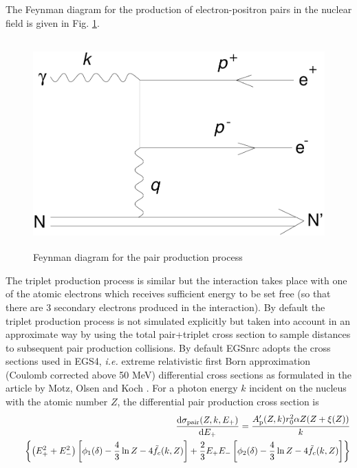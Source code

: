 The Feynman diagram for the production of electron-positron pairs
in the nuclear field is given in Fig. \ref{pair_fig}.
\begin{figure}[h]
\includegraphics[height=8cm,width=12cm]{figures/pair}
\caption{\label{pair_fig} Feynman diagram for the pair
production process}
\end{figure}
The triplet production process is similar but the interaction
takes place with one of the atomic electrons which receives
sufficient energy to be set free (so that there are 3 secondary electrons
produced in the interaction). By default
the triplet production process is
not simulated explicitly but taken into account in an approximate
way by using the total pair+triplet cross section to
sample distances to subsequent pair production collisions.
By default EGSnrc adopts the cross sections used in EGS4, {\em i.e.}
extreme relativistic first Born approximation
(Coulomb corrected above 50 MeV)
differential cross sections  as formulated in the article by
Motz, Olsen and Koch \cite{Mo69}. For a photon energy
$k$ incident on the nucleus with the atomic number $Z$, the
differential pair production cross section is
\begin{eqnarray}
\label{pair-e}
& & {{\rm d}\sigma_{\rm pair}(Z,k,E_+) \over {\rm d}E_+}  =
{A_{\rm p}'(Z,k) r_0^2 \alpha Z (Z + \xi(Z) ) \over k}
\\ & & \quad
\left\{ \left( E_+^2 + E_-^2 \right) \left[ \phi_1(\delta) -
{4 \over 3} \ln Z  - 4 \tilde{f}_c(k,Z) \right] +
{2 \over 3} E_+ E_- \left[ \phi_2(\delta) -
{4 \over 3} \ln Z  - 4 \tilde{f}_c(k,Z) \right] \right\}
\nonumber
\end{eqnarray}
